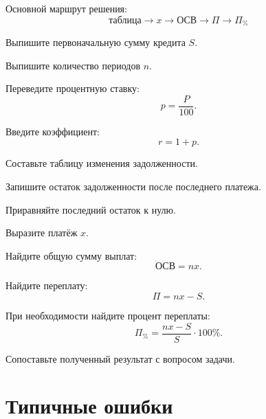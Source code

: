 \documentclass[a4paper,12pt]{article}
\begin{document}
Основной маршрут решения:
\[
\boxed{
\text{таблица}
\longrightarrow
x
\longrightarrow
\text{ОСВ}
\longrightarrow
\Pi
\longrightarrow
\Pi_{\%}
}
\]

\begin{checklist}
  \item Выпишите первоначальную сумму кредита \(S\).

  \item Выпишите количество периодов \(n\).

  \item Переведите процентную ставку:
  \[
  p=\frac{P}{100}.
  \]

  \item Введите коэффициент:
  \[
  r=1+p.
  \]

  \item Составьте таблицу изменения задолженности.

  \item Запишите остаток задолженности после последнего платежа.

  \item Приравняйте последний остаток к нулю.

  \item Выразите платёж \(x\).

  \item Найдите общую сумму выплат:
  \[
  \text{ОСВ}=nx.
  \]

  \item Найдите переплату:
  \[
  \Pi=nx-S.
  \]

  \item При необходимости найдите процент переплаты:
  \[
  \Pi_{\%}=\frac{nx-S}{S}\cdot100\%.
  \]

  \item Сопоставьте полученный результат с вопросом задачи.
\end{checklist}

\section{Типичные ошибки}
\end{document}
